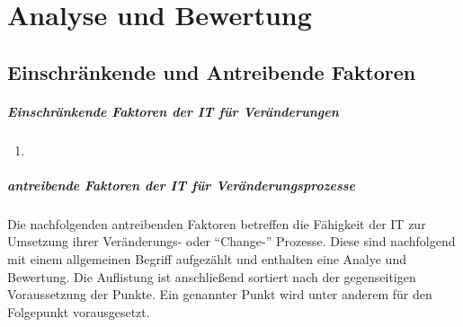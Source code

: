 \chapter{Analyse und Bewertung}
\label{chapter:evaluation}

\section{Einschränkende und Antreibende Faktoren}
\label{section:faktoren-change}

\paragraph{Einschränkende Faktoren der IT für Veränderungen}
\begin{enumerate}
    \item 
\end{enumerate}

\paragraph{antreibende Faktoren der IT für Veränderungsprozesse}
Die nachfolgenden antreibenden Faktoren betreffen die Fähigkeit der IT zur Umsetzung ihrer Veränderungs- oder \enquote{Change-} Prozesse. Diese sind nachfolgend mit einem allgemeinen Begriff aufgezählt und enthalten eine Analye und Bewertung. Die Auflistung ist anschließend sortiert nach der gegenseitigen Voraussetzung der Punkte. Ein genannter Punkt wird unter anderem für den Folgepunkt vorausgesetzt.

